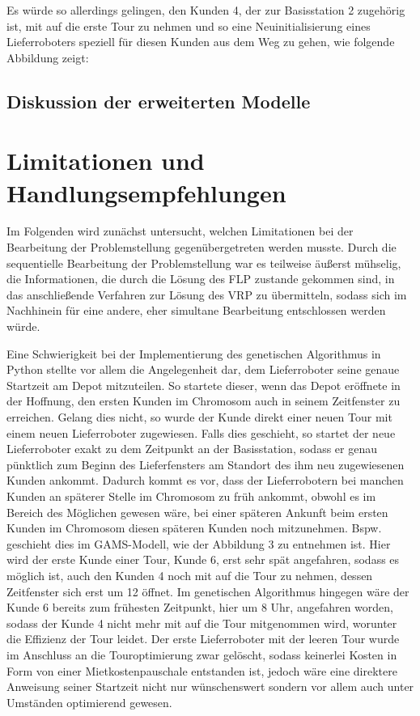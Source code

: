 \documentclass[a4paper,12pt,parskip,bibtotoc,liststotoc]{article}
\begin{document}
Es würde so allerdings gelingen, den Kunden 4, der zur Basisstation 2 zugehörig ist, mit auf die erste Tour zu nehmen und so eine Neuinitialisierung eines Lieferroboters speziell für diesen Kunden aus dem Weg zu gehen, wie folgende Abbildung zeigt: 




\subsection{Diskussion der erweiterten Modelle}




\newpage
\section{Limitationen und Handlungsempfehlungen}


Im Folgenden wird zunächst untersucht, welchen Limitationen bei der Bearbeitung der Problemstellung gegenübergetreten werden musste. 
Durch die sequentielle Bearbeitung der Problemstellung war es teilweise äußerst mühselig, die Informationen, die durch die Lösung des FLP zustande gekommen sind, in das anschließende Verfahren zur Lösung des VRP zu übermitteln, sodass sich im Nachhinein für eine andere, eher simultane Bearbeitung entschlossen werden würde.

Eine Schwierigkeit bei der Implementierung des genetischen Algorithmus in Python stellte vor allem die Angelegenheit dar, dem Lieferroboter seine genaue Startzeit am Depot mitzuteilen. 
So startete dieser, wenn das Depot eröffnete in der Hoffnung, den ersten Kunden im Chromosom auch in seinem Zeitfenster zu erreichen. 
Gelang dies nicht, so wurde der Kunde direkt einer neuen Tour mit einem neuen Lieferroboter zugewiesen. 
Falls dies geschieht, so startet der neue Lieferroboter exakt zu dem Zeitpunkt an der Basisstation, sodass er genau pünktlich zum Beginn des Lieferfensters am Standort des ihm neu zugewiesenen Kunden ankommt.
Dadurch kommt es vor, dass der Lieferrobotern bei manchen Kunden an späterer Stelle im Chromosom zu früh ankommt, obwohl es im Bereich des Möglichen gewesen wäre, bei einer späteren Ankunft beim ersten Kunden im Chromosom diesen späteren Kunden noch mitzunehmen.
Bspw. geschieht dies im GAMS-Modell, wie der Abbildung 3 zu entnehmen ist. 
Hier wird der erste Kunde einer Tour, Kunde 6, erst sehr spät angefahren, sodass es möglich ist, auch den Kunden 4 noch mit auf die Tour zu nehmen, dessen Zeitfenster sich erst um 12 öffnet. 
Im genetischen Algorithmus hingegen wäre der Kunde 6 bereits zum frühesten Zeitpunkt, hier um 8 Uhr, angefahren worden, sodass der Kunde 4 nicht mehr mit auf die Tour mitgenommen wird, worunter die Effizienz der Tour leidet.
Der erste Lieferroboter mit der leeren Tour wurde im Anschluss an die Touroptimierung zwar gelöscht, sodass keinerlei Kosten in Form von einer Mietkostenpauschale entstanden ist, jedoch wäre eine direktere Anweisung seiner Startzeit nicht nur wünschenswert sondern vor allem auch unter Umständen optimierend gewesen.
\end{document}
